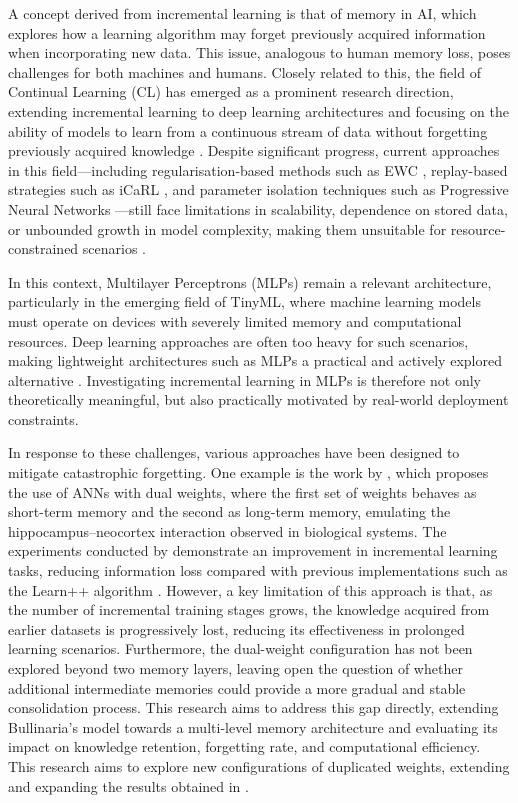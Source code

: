 A concept derived from incremental learning is that of memory in AI, which explores how a 
learning algorithm may forget previously acquired information when incorporating new data. 
This issue, analogous to human memory loss, poses challenges for both machines and humans. 
Closely related to this, the field of Continual Learning (CL) has emerged as a prominent 
research direction, extending incremental learning to deep learning architectures and 
focusing on the ability of models to learn from a continuous stream of data without 
forgetting previously acquired knowledge \cite{de2021continual, PARISI201954}. Despite 
significant progress, current approaches in this field---including regularisation-based 
methods such as EWC \cite{kirkpatrick2017overcoming}, replay-based strategies such as 
iCaRL \cite{rebuffi2017icarl}, and parameter isolation techniques such as Progressive 
Neural Networks \cite{rusu2016pnn}---still face limitations in scalability, dependence on 
stored data, or unbounded growth in model complexity, making them unsuitable for 
resource-constrained scenarios \cite{de2021continual}.

In this context, Multilayer Perceptrons (MLPs) remain a relevant architecture, particularly 
in the emerging field of TinyML, where machine learning models must operate on devices with 
severely limited memory and computational resources. Deep learning approaches are often too 
heavy for such scenarios, making lightweight architectures such as MLPs a practical and 
actively explored alternative \cite{GiraudCarrier2000}. Investigating incremental learning 
in MLPs is therefore not only theoretically meaningful, but also practically motivated by 
real-world deployment constraints.

In response to these challenges, various approaches have been designed to mitigate catastrophic 
forgetting. One example is the work by \cite{bullinaria2009}, which proposes the use of ANNs 
with dual weights, where the first set of weights behaves as short-term memory and the second 
as long-term memory, emulating the hippocampus--neocortex interaction observed in biological 
systems. The experiments conducted by \cite{bullinaria2009} demonstrate an improvement in 
incremental learning tasks, reducing information loss compared with previous implementations 
such as the Learn++ algorithm \cite{li2008, Elwell2011}. However, a key limitation of this 
approach is that, as the number of incremental training stages grows, the knowledge acquired 
from earlier datasets is progressively lost, reducing its effectiveness in prolonged learning 
scenarios. Furthermore, the dual-weight configuration has not been explored beyond two memory 
layers, leaving open the question of whether additional intermediate memories could provide a 
more gradual and stable consolidation process. This research aims to address this gap directly, 
extending Bullinaria's model towards a multi-level memory architecture and evaluating its 
impact on knowledge retention, forgetting rate, and computational efficiency.\\

This research aims to explore new configurations of duplicated weights, extending and expanding the results obtained in \cite{bullinaria2009}.
